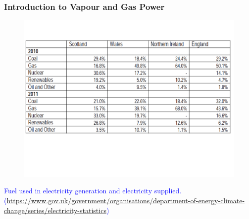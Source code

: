 \documentclass[10pt,compress,handout,ignorenonframetext]{beamer}
\begin{document}
\begin{frame}
 \frametitle{Introduction to Vapour and Gas Power}
    \begin{figure}%
     \begin{center}
      \includegraphics[width=9.cm,clip]{./Pics/Energy_Share_UK}
     \end{center}
    \end{figure}
\vspace{-2cm}
\textcolor{blue}{Fuel used in electricity generation and electricity supplied. (\href{https://www.gov.uk/government/organisations/department-of-energy-climate-change/series/electricity-statistics}{https://www.gov.uk/government/organisations/department-of-energy-climate-change/series/electricity-statistics})}
 \normalsize
\end{frame}
\end{document}
